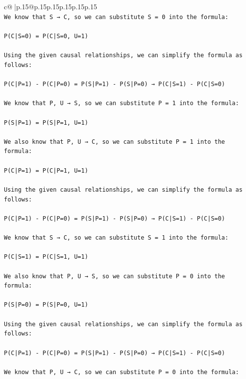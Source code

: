\documentclass{article}
\begin{document}
{\begin{supertabular}{c@{$\;$}|p{.15\linewidth}@{}p{.15\linewidth}p{.15\linewidth}p{.15\linewidth}p{.15\linewidth}p{.15\linewidth}}
{{{\\ 
\texttt{We know that S → C, so we can substitute S = 0 into the formula:} \\
\\ 
\texttt{P(C|S=0) = P(C|S=0, U=1)} \\
\\ 
\texttt{Using the given causal relationships, we can simplify the formula as follows:} \\
\\ 
\texttt{P(C|P=1) {-} P(C|P=0) = P(S|P=1) {-} P(S|P=0) → P(C|S=1) {-} P(C|S=0)} \\
\\ 
\texttt{We know that P, U → S, so we can substitute P = 1 into the formula:} \\
\\ 
\texttt{P(S|P=1) = P(S|P=1, U=1)} \\
\\ 
\texttt{We also know that P, U → C, so we can substitute P = 1 into the formula:} \\
\\ 
\texttt{P(C|P=1) = P(C|P=1, U=1)} \\
\\ 
\texttt{Using the given causal relationships, we can simplify the formula as follows:} \\
\\ 
\texttt{P(C|P=1) {-} P(C|P=0) = P(S|P=1) {-} P(S|P=0) → P(C|S=1) {-} P(C|S=0)} \\
\\ 
\texttt{We know that S → C, so we can substitute S = 1 into the formula:} \\
\\ 
\texttt{P(C|S=1) = P(C|S=1, U=1)} \\
\\ 
\texttt{We also know that P, U → S, so we can substitute P = 0 into the formula:} \\
\\ 
\texttt{P(S|P=0) = P(S|P=0, U=1)} \\
\\ 
\texttt{Using the given causal relationships, we can simplify the formula as follows:} \\
\\ 
\texttt{P(C|P=1) {-} P(C|P=0) = P(S|P=1) {-} P(S|P=0) → P(C|S=1) {-} P(C|S=0)} \\
\\ 
\texttt{We know that P, U → C, so we can substitute P = 0 into the formula:} \\
}}}
\end{supertabular}}
\end{document}
